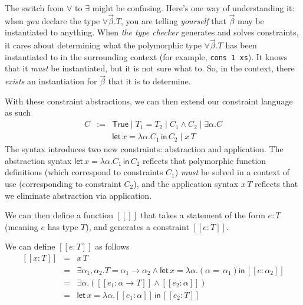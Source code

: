 {The switch from $\forall$ to $\exists$ might be confusing. Here's one way of understanding it: when \textit{you} declare the type $\forall \vec{\beta}. T$, you are telling \textit{yourself} that $\vec{\beta}$ may be instantiated to anything. When \textit{the type checker} generates and solves constraints, it cares about determining what the polymorphic type $\forall \vec{\beta}. T$ has been instantiated to in the surrounding context (for example, \texttt{cons 1 xs}). It knows that it \textit{must} be instantiated, but it is not sure what to. So, in the context, there \textit{exists} an instantiation for $\vec{\beta}$ that it is to determine.

With these constraint abstractions, we can then extend our constraint language as such
\[\begin{array}{lcl}
     C&:=&\textsf{True} \mid T_1 = T_2 \mid C_1 \land C_2 \mid \exists \alpha . C \\
        &&\textsf{let}\, x = \lambda \alpha . C_1 \, \textsf{in} \, C_2 \mid x \, T
     \end{array}
\]
The syntax introduces two new constraints: abstraction and application. The abstraction syntax  $\textsf{let}\, x = \lambda \alpha . C_1 \, \textsf{in} \, C_2$ reflects that polymorphic function definitions (which correspond to constraints $C_1$) \textit{must} be solved in a context of use (corresponding to constraint $C_2$), and the application syntax $x \, T$ reflects that we eliminate abstraction via application.

\newcommand{\interpret}[1]{[\![#1]\!]}
We can then define a function $\interpret{}$ that takes a statement of the form $e: T$ (meaning $e$ has type $T$), and generates a constraint $\interpret{e: T}$.

We can define $\interpret{e:T}$ as follows
\[\begin{array}{rcl}
     \interpret{x:T}&=&x \, T  \\
     \interpret{\lambda x.e: T}&=&\exists \alpha_1, \alpha_2 . T = \alpha_1 \to \alpha_2 \land \textsf{let} \,  x = \lambda \alpha. (\alpha = \, \alpha_1) \textsf{in} \, \interpret{e: \alpha_2}\\
     \interpret{e_1 e_2: T} &=& \exists \alpha. (\interpret{e_1: \alpha \to T} \land \interpret{e_2: \alpha}) \\
     \interpret{\texttt{let}\, x = e_1 \, \texttt{in} \, e_2} &=& \textsf{let}\, x = \lambda \alpha. \interpret{e_1: \alpha} \, \textsf{in} \, \interpret{e_2: T}
\end{array}\]

}

